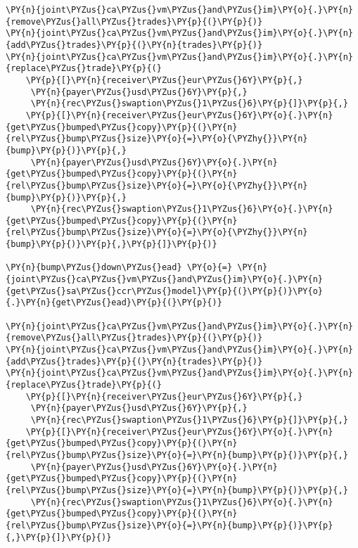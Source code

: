     \begin{tcolorbox}[breakable, size=fbox, boxrule=1pt, pad at break*=1mm,colback=cellbackground, colframe=cellborder]
\begin{Verbatim}[commandchars=\\\{\}]
\PY{n}{joint\PYZus{}ca\PYZus{}vm\PYZus{}and\PYZus{}im}\PY{o}{.}\PY{n}{remove\PYZus{}all\PYZus{}trades}\PY{p}{(}\PY{p}{)}
\PY{n}{joint\PYZus{}ca\PYZus{}vm\PYZus{}and\PYZus{}im}\PY{o}{.}\PY{n}{add\PYZus{}trades}\PY{p}{(}\PY{n}{trades}\PY{p}{)}
\PY{n}{joint\PYZus{}ca\PYZus{}vm\PYZus{}and\PYZus{}im}\PY{o}{.}\PY{n}{replace\PYZus{}trade}\PY{p}{(}
    \PY{p}{[}\PY{n}{receiver\PYZus{}eur\PYZus{}6Y}\PY{p}{,}
     \PY{n}{payer\PYZus{}usd\PYZus{}6Y}\PY{p}{,}
     \PY{n}{rec\PYZus{}swaption\PYZus{}1\PYZus{}6}\PY{p}{]}\PY{p}{,}
    \PY{p}{[}\PY{n}{receiver\PYZus{}eur\PYZus{}6Y}\PY{o}{.}\PY{n}{get\PYZus{}bumped\PYZus{}copy}\PY{p}{(}\PY{n}{rel\PYZus{}bump\PYZus{}size}\PY{o}{=}\PY{o}{\PYZhy{}}\PY{n}{bump}\PY{p}{)}\PY{p}{,}
     \PY{n}{payer\PYZus{}usd\PYZus{}6Y}\PY{o}{.}\PY{n}{get\PYZus{}bumped\PYZus{}copy}\PY{p}{(}\PY{n}{rel\PYZus{}bump\PYZus{}size}\PY{o}{=}\PY{o}{\PYZhy{}}\PY{n}{bump}\PY{p}{)}\PY{p}{,}
     \PY{n}{rec\PYZus{}swaption\PYZus{}1\PYZus{}6}\PY{o}{.}\PY{n}{get\PYZus{}bumped\PYZus{}copy}\PY{p}{(}\PY{n}{rel\PYZus{}bump\PYZus{}size}\PY{o}{=}\PY{o}{\PYZhy{}}\PY{n}{bump}\PY{p}{)}\PY{p}{,}\PY{p}{]}\PY{p}{)}

\PY{n}{bump\PYZus{}down\PYZus{}ead} \PY{o}{=} \PY{n}{joint\PYZus{}ca\PYZus{}vm\PYZus{}and\PYZus{}im}\PY{o}{.}\PY{n}{get\PYZus{}sa\PYZus{}ccr\PYZus{}model}\PY{p}{(}\PY{p}{)}\PY{o}{.}\PY{n}{get\PYZus{}ead}\PY{p}{(}\PY{p}{)}

\PY{n}{joint\PYZus{}ca\PYZus{}vm\PYZus{}and\PYZus{}im}\PY{o}{.}\PY{n}{remove\PYZus{}all\PYZus{}trades}\PY{p}{(}\PY{p}{)}
\PY{n}{joint\PYZus{}ca\PYZus{}vm\PYZus{}and\PYZus{}im}\PY{o}{.}\PY{n}{add\PYZus{}trades}\PY{p}{(}\PY{n}{trades}\PY{p}{)}
\PY{n}{joint\PYZus{}ca\PYZus{}vm\PYZus{}and\PYZus{}im}\PY{o}{.}\PY{n}{replace\PYZus{}trade}\PY{p}{(}
    \PY{p}{[}\PY{n}{receiver\PYZus{}eur\PYZus{}6Y}\PY{p}{,}
     \PY{n}{payer\PYZus{}usd\PYZus{}6Y}\PY{p}{,}
     \PY{n}{rec\PYZus{}swaption\PYZus{}1\PYZus{}6}\PY{p}{]}\PY{p}{,}
    \PY{p}{[}\PY{n}{receiver\PYZus{}eur\PYZus{}6Y}\PY{o}{.}\PY{n}{get\PYZus{}bumped\PYZus{}copy}\PY{p}{(}\PY{n}{rel\PYZus{}bump\PYZus{}size}\PY{o}{=}\PY{n}{bump}\PY{p}{)}\PY{p}{,}
     \PY{n}{payer\PYZus{}usd\PYZus{}6Y}\PY{o}{.}\PY{n}{get\PYZus{}bumped\PYZus{}copy}\PY{p}{(}\PY{n}{rel\PYZus{}bump\PYZus{}size}\PY{o}{=}\PY{n}{bump}\PY{p}{)}\PY{p}{,}
     \PY{n}{rec\PYZus{}swaption\PYZus{}1\PYZus{}6}\PY{o}{.}\PY{n}{get\PYZus{}bumped\PYZus{}copy}\PY{p}{(}\PY{n}{rel\PYZus{}bump\PYZus{}size}\PY{o}{=}\PY{n}{bump}\PY{p}{)}\PY{p}{,}\PY{p}{]}\PY{p}{)}


\end{Verbatim}
\end{tcolorbox}
